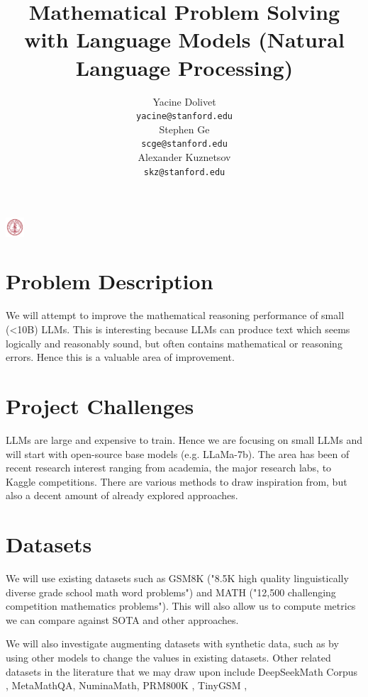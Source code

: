 \documentclass{article}
\title{Mathematical Problem Solving with Language Models (Natural Language Processing)}
\author{
  Yacine Dolivet\\
  \texttt{yacine@stanford.edu} \\
  \And
  Stephen Ge\\
  \texttt{scge@stanford.edu} \\
   \And
  Alexander Kuznetsov\\
  \texttt{skz@stanford.edu} \\
}
\begin{document}

\begin{center}
\includegraphics[width=0.7cm, height=0.7cm]{stanford.png}
\end{center}

\maketitle

\section{Problem Description}	
We will attempt to improve the mathematical reasoning performance of small (<10B) LLMs. This is interesting because LLMs can produce text which seems logically and reasonably sound, but often contains mathematical or reasoning errors. Hence this is a valuable area of improvement.


\section{Project Challenges}
LLMs are large and expensive to train. Hence we are focusing on small LLMs and will start with open-source base models (e.g. LLaMa-7b). The area has been of recent research interest ranging from academia, the major research labs, to Kaggle competitions. There are various methods to draw inspiration from, but also a decent amount of already explored approaches.

\section{Datasets}
We will use existing datasets such as GSM8K \cite{cobbe}("8.5K high quality linguistically diverse grade school math word problems") and MATH \cite{hendrycks} ("12,500 challenging
competition mathematics problems"). This will also allow us to compute metrics we can compare against SOTA and other approaches. 

We will also investigate augmenting datasets with synthetic data, such as by using other models to change the values in existing datasets. Other related datasets in the literature that we may draw upon include DeepSeekMath Corpus \cite{shao}, MetaMathQA, NuminaMath, PRM800K \cite{lightman}, TinyGSM \cite{liu}, 
\end{document}
